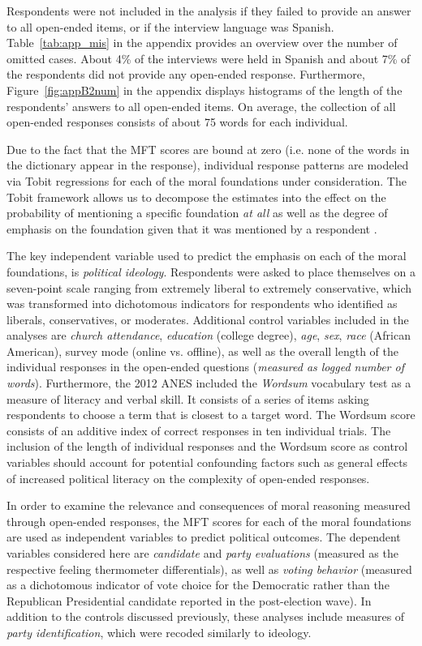 \documentclass[12pt]{article}
\begin{document}
Respondents were not included in the analysis if they failed to provide an answer to all open-ended items, or if the interview language was Spanish. Table~\ref{tab:app_mis} in the appendix provides an overview over the number of omitted cases. About 4\% of the interviews were held in Spanish and about 7\% of the respondents did not provide any open-ended response. Furthermore, Figure~\ref{fig:appB2num} in the appendix displays histograms of the length of the respondents' answers to all open-ended items. On average, the collection of all open-ended responses consists of about 75 words for each individual.

Due to the fact that the MFT scores are bound at zero (i.e. none of the words in the dictionary appear in the response), individual response patterns are modeled via Tobit regressions for each of the moral foundations under consideration. The Tobit framework allows us to decompose the estimates into the effect on the probability of mentioning a specific foundation \textit{at all} as well as the degree of emphasis on the foundation given that it was mentioned by a respondent \citep[see][for details on the decomposition of Tobit model estimates]{mcdonald1980uses}.

The key independent variable used to predict the emphasis on each of the moral foundations, is \textit{political ideology}. Respondents were asked to place themselves on a seven-point scale ranging from extremely liberal to extremely conservative, which was transformed into dichotomous indicators for respondents who identified as liberals, conservatives, or moderates. Additional control variables included in the analyses are \textit{church attendance}, \textit{education} (college degree), \textit{age}, \textit{sex}, \textit{race} (African American), survey mode (online vs. offline), as well as the overall length of the individual responses in the open-ended questions (\textit{measured as logged number of words}). Furthermore, the 2012 ANES included the \textit{Wordsum} vocabulary test as a measure of literacy and verbal skill. It consists of a series of items asking respondents to choose a term that is closest to a target word. The Wordsum score consists of an additive index of correct responses in ten individual trials. The inclusion of the length of individual responses and the Wordsum score as control variables should account for potential confounding factors such as general effects of increased political literacy on the complexity of open-ended responses.

In order to examine the relevance and consequences of moral reasoning measured through open-ended responses, the MFT scores for each of the moral foundations are used as independent variables to predict political outcomes. The dependent variables considered here are \textit{candidate} and \textit{party evaluations} (measured as the respective feeling thermometer differentials), as well as \textit{voting behavior} (measured as a dichotomous indicator of vote choice for the Democratic rather than the Republican Presidential candidate reported in the post-election wave). In addition to the controls discussed previously, these analyses include measures of \textit{party identification}, which were recoded similarly to ideology.
\end{document}
